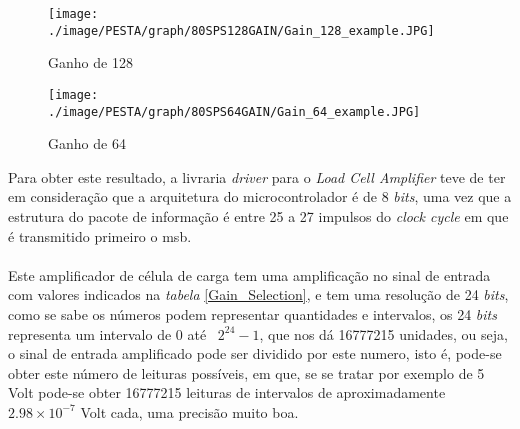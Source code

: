 \begin{minipage}[!b]{\linewidth}
\begin{minipage}[!b]{.43\linewidth}
\begin{figure}[H]
	\captionsetup{justification=raggedright,singlelinecheck=false}
	\flushleft
	\texttt{[image: ./image/PESTA/graph/80SPS128GAIN/Gain\_128\_example.JPG]}
	\caption{Ganho de 128}
	\label{Gain_128_example}
\end{figure}
\end{minipage}
\hspace{.8cm}
\begin{minipage}[!b]{.43\linewidth}
\begin{figure}[H]
	\captionsetup{justification=raggedright,singlelinecheck=false}
	\flushleft
	\texttt{[image: ./image/PESTA/graph/80SPS64GAIN/Gain\_64\_example.JPG]}
	\caption{Ganho de 64}
	\label{Gain_64_example}
\end{figure}
\end{minipage}
\end{minipage}
Para obter este resultado, a livraria \textit{driver} para o \textit{Load Cell Amplifier} teve de ter em consideração que a arquitetura do microcontrolador é de 8 \textit{bits}, uma vez que a estrutura do pacote de informação é entre 25 a 27 impulsos do \textit{clock cycle} em que é transmitido primeiro o \ac{msb}.
\\
\\
Este amplificador de célula de carga tem uma amplificação no sinal de entrada com valores indicados na \textit{tabela} \ref{Gain_Selection}, e tem uma resolução de 24 \textit{bits}, como se sabe os números podem representar quantidades e intervalos, os 24 \textit{bits} representa um intervalo de 0 até \, $2^{24}-1$, que nos dá 16777215 unidades, ou seja, o sinal de entrada amplificado pode ser dividido por este numero, isto é, pode-se obter este número de leituras possíveis, em que, se se tratar por exemplo de 5 Volt pode-se obter 16777215 leituras de intervalos de aproximadamente $2.98 \times 10^{-7}$ Volt cada, uma precisão muito boa.

